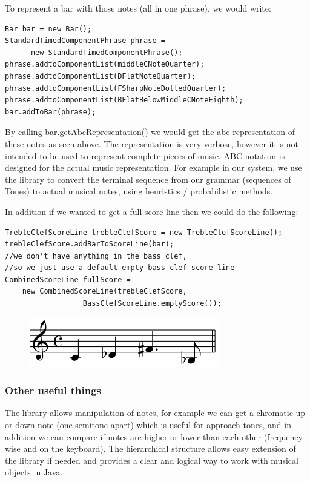 \documentclass[pdftex,12pt,a4paper]{report}
\begin{document}
To represent a bar with those notes (all in one phrase), we would write:

\begin{lstlisting}
Bar bar = new Bar();
StandardTimedComponentPhrase phrase = 
      new StandardTimedComponentPhrase();
phrase.addtoComponentList(middleCNoteQuarter);
phrase.addtoComponentList(DFlatNoteQuarter);
phrase.addtoComponentList(FSharpNoteDottedQuarter);
phrase.addtoComponentList(BFlatBelowMiddleCNoteEighth);
bar.addToBar(phrase);

\end{lstlisting}

By calling bar.getAbcRepresentation() we would get the abc representation of these notes as seen above. The representation is very verbose, however it is not intended to be used to represent complete pieces of music. ABC notation is designed for the actual music representation. For example in our system, we use the library to convert the terminal sequence from our grammar (sequences of Tones) to actual musical notes, using heuristics / probabilistic methods. 

In addition if we wanted to get a full score line then we could do the following:

\begin{lstlisting}
TrebleClefScoreLine trebleClefScore = new TrebleClefScoreLine();
trebleClefScore.addBarToScoreLine(bar);
//we don't have anything in the bass clef, 
//so we just use a default empty bass clef score line
CombinedScoreLine fullScore = 
	new CombinedScoreLine(trebleClefScore, 
			      BassClefScoreLine.emptyScore());

\end{lstlisting}

\begin{figure}[here]
  \centering
  \includegraphics[scale=0.6]{figure/abcnotationexample.png}
  \label{fig:abcnotationexample}
\end{figure}

\subsubsection{Other useful things}
The library allows manipulation of notes, for example we can get a chromatic up or down note (one semitone apart) which is useful for approach tones, and in addition we can compare if notes are higher or lower than each other (frequency wise and on the keyboard). The hierarchical structure allows easy extension of the library if needed and provides a clear and logical way to work with musical objects in Java.
\end{document}
